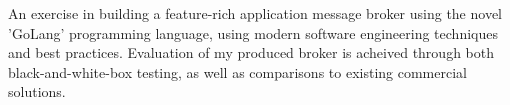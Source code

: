An exercise in building a feature-rich application message broker using the novel 'GoLang' programming language, using modern software engineering techniques and best practices. Evaluation of my produced broker is acheived through both black-and-white-box testing, as well as comparisons to existing commercial solutions.
